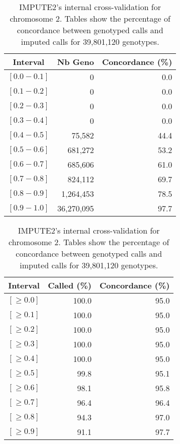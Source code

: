 \documentclass[10pt,twoside,english]{scrartcl}
\begin{document}
\begin{table}[H]
\protect\caption{IMPUTE2's internal cross-validation for chromosome 2. Tables show the
percentage of concordance between genotyped calls and imputed calls
for 39,801,120 genotypes.\label{tab:cross_validation_chr_2}}

\centering

\begin{tabular}{crr}
\hline 
\multicolumn{1}{c}{\textbf{Interval}}
 & \multicolumn{1}{c}{\textbf{Nb Geno}}
 & \multicolumn{1}{c}{\textbf{Concordance (\%)}}
\\
\hline 

$[0.0-0.1]$ & 0 & 0.0\\
$[0.1-0.2]$ & 0 & 0.0\\
$[0.2-0.3]$ & 0 & 0.0\\
$[0.3-0.4]$ & 0 & 0.0\\
$[0.4-0.5]$ & 75,582 & 44.4\\
$[0.5-0.6]$ & 681,272 & 53.2\\
$[0.6-0.7]$ & 685,606 & 61.0\\
$[0.7-0.8]$ & 824,112 & 69.7\\
$[0.8-0.9]$ & 1,264,453 & 78.5\\
$[0.9-1.0]$ & 36,270,095 & 97.7\\
\hline 
\end{tabular}
\hfill
\begin{tabular}{crr}
\hline 
\multicolumn{1}{c}{\textbf{Interval}}
 & \multicolumn{1}{c}{\textbf{Called (\%)}}
 & \multicolumn{1}{c}{\textbf{Concordance (\%)}}
\\
\hline 

$[\geq 0.0]$ & 100.0 & 95.0\\
$[\geq 0.1]$ & 100.0 & 95.0\\
$[\geq 0.2]$ & 100.0 & 95.0\\
$[\geq 0.3]$ & 100.0 & 95.0\\
$[\geq 0.4]$ & 100.0 & 95.0\\
$[\geq 0.5]$ & 99.8 & 95.1\\
$[\geq 0.6]$ & 98.1 & 95.8\\
$[\geq 0.7]$ & 96.4 & 96.4\\
$[\geq 0.8]$ & 94.3 & 97.0\\
$[\geq 0.9]$ & 91.1 & 97.7\\
\hline 
\end{tabular}


\end{table}
\end{document}

